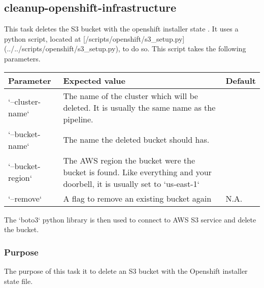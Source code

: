 \subsection{cleanup-openshift-infrastructure}\label{subsec:cleanup-openshift-infrastructure}

This task deletes the S3 bucket with the openshift installer state .
It uses a python script, located at [/scripts/openshift/s3_setup.py](../../scripts/openshift/s3_setup.py), to do so.
This script takes the following parameters.

\begin{table}
    \centering
    \begin{tabular}{|l|l|l|}
    \hline
        Parameter & Expected value & Default \\ \hline
        `--cluster-name` & The name of the cluster which will be deleted. It is usually the same name as the pipeline. & ~ \\ \hline
        `--bucket-name` & The name the deleted bucket should has. & ~ \\ \hline
        `--bucket-region` & The AWS region the bucket were the bucket is found. Like everything and your doorbell, it is usually set to `us-east-1` & ~ \\ \hline
        `--remove` & A flag to remove an existing bucket again & N.A. \\ \hline
    \end{tabular}
\end{table}

The `boto3` python library is then used to connect to AWS S3 service and delete the bucket.

\subsubsection{Purpose}\label{subsubsec:coi-Purpose}

The purpose of this task it to delete an S3 bucket with the Openshift installer state file.

